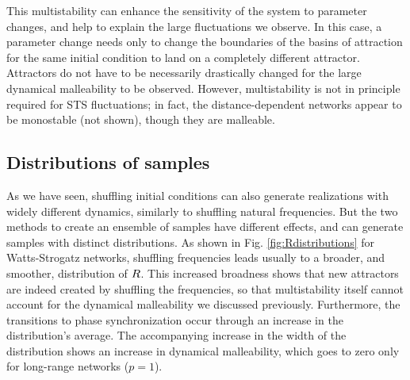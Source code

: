 This multistability can enhance the sensitivity of the system to parameter changes, and help to explain the large fluctuations we observe. In this case, a parameter change needs only to change the boundaries of the basins of attraction for the same initial condition to land on a completely different attractor. Attractors do not have to be necessarily drastically changed for the large dynamical malleability to be observed.
However, multistability is not in principle required for STS fluctuations; in fact, the distance-dependent networks appear to be monostable (not shown), though they are malleable. %

\subsection{Distributions of samples}
As we have seen, shuffling initial conditions can also generate realizations with widely different dynamics, similarly to shuffling natural frequencies. But the two methods to create an ensemble of samples have different effects, and can generate samples with distinct distributions. As shown in Fig. \ref{fig:Rdistributions} for Watts-Strogatz networks, shuffling frequencies leads usually to a broader, and smoother, distribution of $R$. This increased broadness shows that new attractors are indeed created by shuffling the frequencies, so that multistability itself cannot account for the dynamical malleability we discussed previously. Furthermore, the transitions to phase synchronization occur through an increase in the distribution's average. The accompanying increase in the width of the distribution shows an increase in dynamical malleability, which goes to zero only for long-range networks ($p = 1$). 

